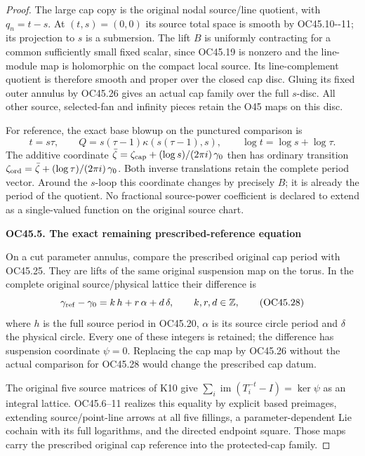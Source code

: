 \begin{proof}
The large cap copy is the original nodal
source/line quotient, with \(q_n=t-s\).
At \((t,s)=(0,0)\) its source total space is
smooth by OC45.10-\/-11; its projection to \(s\)
is a submersion. The lift \(B\) is uniformly
contracting for a common sufficiently small
fixed scalar, since OC45.19 is nonzero and
the line-module map is holomorphic on the
compact local source. Its line-complement
quotient is therefore smooth and proper over
the closed cap disc. Gluing its fixed outer
annulus by OC45.26 gives an actual cap
family over the full \(s\)-disc. All other
source, selected-fan and infinity pieces
retain the O45 maps on this disc.

For reference, the exact base blowup on the
punctured comparison is
\[
 t=s\tau,\qquad
 Q=s(\tau-1)\kappa(s(\tau-1),s),\qquad
 \log t=\log s+\log\tau.
 \tag{OC45.27}
\]
The additive coordinate
\(\bar\zeta=\zeta_{\rm cap}
+(\log s)/(2\pi i)\,\gamma_0\)
then has ordinary transition
\(\zeta_{\rm ord}=\bar\zeta+
(\log\tau)/(2\pi i)\,\gamma_0\).
Both inverse translations retain the complete
period vector. Around the \(s\)-loop this
coordinate changes by precisely \(B\);
it is already the period of the quotient.
No fractional source-power coefficient is
declared to extend as a single-valued
function on the original source chart.

\par

\medskip\noindent\textbf{OC45.5. The exact remaining prescribed-reference equation}

\par\nobreak

On a cut parameter annulus, compare the
prescribed original cap period with OC45.25.
They are lifts of the same original
suspension map on the torus. In the complete
original source/physical lattice their
difference is
\[
 \gamma_{\rm ref}-\gamma_0
        =k\,h+r\,\alpha+d\,\delta,\qquad k,r,d\in\mathbb Z,
 \tag{OC45.28}
\]
where \(h\) is the full source period in
OC45.20, \(\alpha\) is its source circle
period and \(\delta\) the physical circle.
Every one of these integers is retained;
the difference has suspension coordinate
\(\psi=0\). Replacing the cap map by
OC45.26 without the actual comparison
for OC45.28 would change the prescribed
cap datum.

The original five source matrices of K10 give
\(\sum_i\operatorname{im}(T_i^{-t}-I)=\ker\psi\)
as an integral lattice. OC45.6--11 realizes this equality
by explicit based preimages, extending source/point-line
arrows at all five fillings, a parameter-dependent Lie
cochain with its full logarithms, and the directed endpoint
square. Those maps carry the prescribed original cap
reference into the protected-cap family.


\end{proof}
